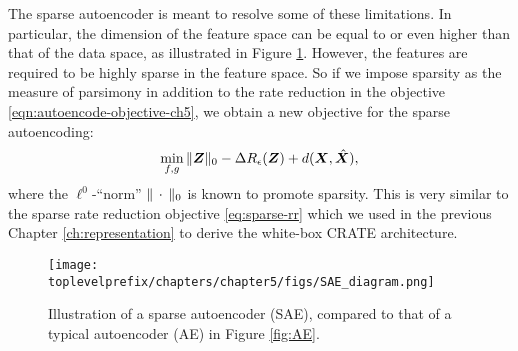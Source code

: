 \documentclass[../../book-main.tex]{subfiles}
\begin{document}
The sparse autoencoder is meant to resolve some of these limitations. In
particular, the dimension of the feature space can be equal to or
even higher than that of the data space, as illustrated in Figure
\ref{fig:SAE}. However, the features are required to be highly
sparse in the feature space. So if we impose sparsity as the measure
of parsimony in addition to the rate reduction in the objective
\eqref{eqn:autoencode-objective-ch5}, we obtain a new objective for
the sparse autoencoding:
\begin{equation}
  \min_{f, g}
  \|\bm{Z}\|_0 - \Delta R_{\epsilon}(\bm{Z}) + d(\bm{X}, \hat {\bm{X}}),
  \label{eqn:autoencode-sparse}
\end{equation}
where the $\ell^0$-``norm'' $\|\,\cdot\,\|_0$ is known to promote sparsity.
This is very similar to the sparse rate reduction objective
\eqref{eq:sparse-rr} which we used in the previous Chapter \ref{ch:representation} to derive the white-box CRATE architecture.

\begin{figure}
  \centering
  \texttt{[image: \\toplevelprefix/chapters/chapter5/figs/SAE\_diagram.png]}
  \caption{Illustration of a sparse autoencoder (SAE), compared to
  that of a typical autoencoder (AE) in Figure \ref{fig:AE}. }
  \label{fig:SAE}
\end{figure}

\end{document}
